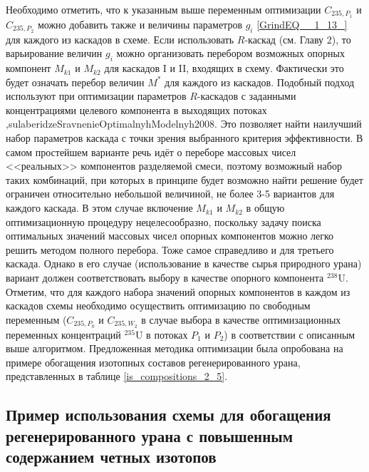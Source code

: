 Необходимо отметить, что к указанным выше переменным оптимизации $C_{235,{P_1}}$ и $C_{235,{P_2}}$ можно добавить также и величины параметров $g_{i}$  \ref{GrindEQ__1_13_} для каждого из каскадов в схеме. Если использовать $R$-каскад (см. Главу 2), то варьирование величин $g_{i}$ можно организовать перебором возможных опорных компонент $M_{k1}$ и $M_{k2}$ для каскадов I и II, входящих в схему. Фактически это будет означать перебор величин $M^{*}$ для каждого из каскадов. Подобный подход используют при оптимизации параметров $R$-каскадов с заданными концентрациями целевого компонента в выходящих потоках \cite{songComparativeStudyModel2010},{sulaberidzeSravnenieOptimalnyhModelnyh2008}. Это позволяет найти наилучший набор параметров каскада с точки зрения выбранного критерия эффективности. В самом простейшем варианте речь идёт о переборе массовых чисел <<реальных>> компонентов разделяемой смеси, поэтому возможный набор таких комбинаций, при которых в принципе будет возможно найти решение будет ограничен относительно небольшой величиной, не более 3-5 вариантов для каждого каскада. В этом случае включение $M_{k1}$ и $M_{k2}$ в общую оптимизационную процедуру нецелесообразно, поскольку задачу поиска оптимальных значений массовых чисел опорных компонентов можно легко решить методом полного перебора. Тоже самое справедливо и для третьего каскада.
Однако в его случае (использование в качестве сырья природного урана) вариант должен соответствовать выбору в качестве опорного компонента $^{238}$U. Отметим, что для каждого набора значений опорных компонентов в каждом из каскадов схемы необходимо осуществить оптимизацию по свободным переменным ($C_{235,P_0}$ и $C_{235,W_2}$ в случае выбора в качестве оптимизационных переменных концентраций $^{235}$U в потоках $P_1$ и $P_2$) в соответствии с описанным выше алгоритмом. 
Предложенная методика оптимизации была опробована на примере обогащения изотопных составов регенерированного урана, представленных в таблице \ref{is_compositions_2_5}.


\subsection{Пример использования схемы для обогащения регенерированного урана с повышенным содержанием четных изотопов}\label{example_trip}

